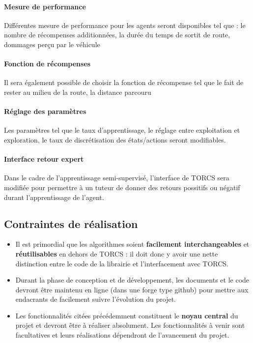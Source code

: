 \documentclass[a4paper,12pt]{article}
\begin{document}
		\paragraph{Mesure de performance} Différentes mesure de performance pour les agents seront disponibles
		tel que : le nombre de récompenses additionnées, la durée du temps de sortit de route, dommages perçu par  
                le véhicule 
		\paragraph{Fonction de récompenses} Il sera également possible de choisir la fonction de récompense 
		tel que le fait de rester au milieu de la route, la distance parcouru
		\paragraph{Réglage des paramètres} Les paramètres tel que le taux d'apprentissage, le réglage entre
		exploitation et exploration, le taux de discrétisation des états/actions seront modifiables.
		\paragraph{Interface retour expert} Dans le cadre de l'apprentissage semi-supervisé, l'interface de TORCS
		sera modifiée pour permettre à un tuteur de donner des retours possitifs ou négatif durant l'apprentissage
		de l'agent.
	\subsection{Contraintes de réalisation}
	  \begin{itemize}
	   \item Il est primordial que les algorithmes soient \textbf{facilement interchangeables} et \textbf{réutilisables}
	   en dehors de TORCS : il doit donc y avoir une nette distinction entre le code de la librairie et
	   l'interfacement avec TORCS.
	   \item Durant la phase de conception et de développement, les documents et le code devront être maintenu 
	   en ligne (dans une forge type github) pour mettre aux endacrants de facilement suivre l'évolution du projet.
	   \item Les fonctionnalités citées précédemment constituent le \textbf{noyau central} du projet et devront être à
	   réaliser absolument. Les fonctionnalités à venir sont facultatives et leurs réalisations dépendront de 
	   l'avancement du projet.
	  \end{itemize}
		
\end{document}
